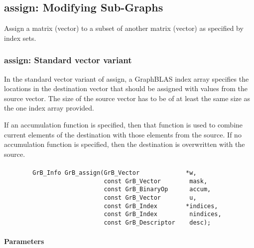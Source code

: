 \subsection{{\sf assign}: Modifying Sub-Graphs}
\label{Sec:assign}

Assign a matrix (vector) to a subset  of another matrix (vector) as specified by index sets.

\subsubsection{{\sf assign}: Standard vector variant}

In the standard vector variant of {\sf assign}, a GraphBLAS index array specifies
the locations in the destination vector that should be assigned with values
from the source vector.  The size of the source vector has to be of at least the same size as the one
index array provided.

If an accumulation function is specified, then that function is used
to combine current elements of the destination with those elements
from the source.  If no accumulation function is specified, then the
destination is overwritten with the source.


\paragraph{\syntax}

\begin{verbatim}
        GrB_Info GrB_assign(GrB_Vector             *w,
                            const GrB_Vector        mask,
                            const GrB_BinaryOp      accum,
                            const GrB_Vector        u,
                            const GrB_Index        *indices,
                            const GrB_Index         nindices,
                            const GrB_Descriptor    desc);
\end{verbatim}

\paragraph{Parameters}

